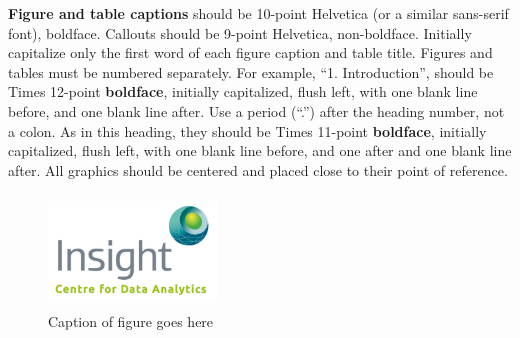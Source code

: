 \documentclass[times, 10pt, twocolumn, a4paper]{article}
\begin{document}
{\bf Figure and table captions} should be 10-point Helvetica (or a similar sans-serif font), boldface. Callouts should be 9-point Helvetica, non-boldface. Initially capitalize only the first word of each figure caption and table title. Figures and tables must be numbered separately. \cite{ex2}
For example, ``1. Introduction'', should be Times 12-point {\bf boldface}, initially capitalized, flush left, with one blank line before, and one blank line after. Use a period (``.'') after the heading number, not a colon.
As in this heading, they should be Times 11-point {\bf boldface}, initially capitalized, flush left, with one blank line before, and one after and one blank line after.
All graphics should be centered and placed close to their point of reference.
\begin{figure}[ht]
\begin{center}
\includegraphics[width=4.5cm,height=3cm]{logo}
\caption{Caption of figure goes here}
\label{foo}
\end{center}
\end{figure}


\end{document}
